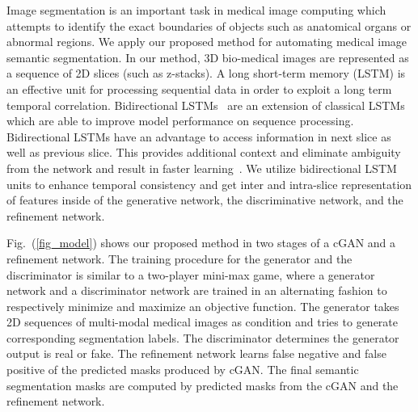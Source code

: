 \documentclass[10pt,twocolumn,letterpaper]{article}
\begin{document}
Image segmentation is an important task in medical image computing which attempts to identify the exact boundaries of objects such as anatomical organs or abnormal regions. We apply our proposed method for automating medical image semantic segmentation. In our method, 3D bio-medical images are represented as a sequence of 2D slices (such as z-stacks). A long short-term memory (LSTM) is an effective unit for processing sequential data in order to exploit a long term temporal correlation. Bidirectional LSTMs~\cite{graves2005framewise} are an extension of classical LSTMs which are able to improve model performance on sequence processing. Bidirectional LSTMs have an advantage to access information in next slice as well as previous slice. This provides additional context and eliminate ambiguity from the network and result in faster learning~\cite{graves2005framewise}.
We utilize bidirectional LSTM units to enhance temporal consistency and get inter and intra-slice representation of features inside of the generative network, the discriminative network, and the refinement network.


Fig.~(\ref{fig_model}) shows our proposed method in two stages of a cGAN and a refinement network. The training procedure for the generator and the discriminator is similar to a two-player mini-max game, where a generator network and a discriminator network are trained in an alternating fashion to respectively minimize and maximize an objective function.
The generator takes 2D sequences of multi-modal medical images as condition and tries to generate corresponding segmentation labels. The discriminator determines the generator output is real or fake.
The refinement network learns false negative and false positive of the predicted masks produced by cGAN. The final semantic segmentation masks are computed by predicted masks from the cGAN and the refinement network.
\end{document}
